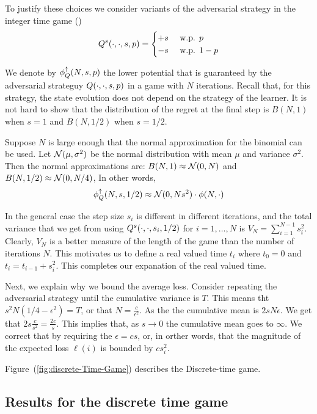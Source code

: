 \documentclass{article}[12pt]
\begin{document}
To justify these choices we consider variants of the adversarial
strategy in the integer time game (\label{eqn:adv-strat-p})
\begin{equation} \label{eqn:adv-strat-s}
  Q^s(\cdot,\cdot,s,p) =
  \begin{cases}
    +s & \mbox{ w.p. } p\\
    -s & \mbox{ w.p. } 1-p\\
  \end{cases}
\end{equation}

We denote by $\phi_{Q}^{\uparrow}(N,s,p)$ the lower potential that is guaranteed
by the adversarial strateguy $Q(\cdot,\cdot,s,p)$ in a game with
$N$ iterations. Recall that, for this strategy, the state evolution
does not depend on the strategy of the learner. It is not hard to
show that the distribution of the regret at the final step is $B(N,1)$
when $s=1$ and $B(N,1/2)$ when $s=1/2$.

Suppose $N$ is large enough that the normal approximation for the
binomial can be used. Let ${\cal N}(\mu,\sigma^2)$ be the normal
distribution with mean $\mu$ and variance $\sigma^2$. Then the normal
approximations are:
$B(N,1) \approx {\cal N}(0,N)$ and $B(N,1/2) \approx {\cal N}(0,N/4)$,
In other words,
$$\phi_{Q}^{\uparrow}(N,s,1/2) \approx {\cal N}(0,Ns^2) \cdot \phi(N,\cdot)$$

In the general case the step size $s_i$ is  different in different
iterations, and the total variance that we get from using
$Q^s(\cdot,\cdot,s_i,1/2)$ for $i=1,\ldots,N$ is
$V_N=\sum_{i=1}^{N-1}s_i^2$. Clearly, $V_N$ is a better measure of the
length of the game than the number of iterations $N$. This motivates
us to define a real valued time $t_i$ where $t_0=0$ and $t_i = t_{i-1}+s_i^2$.
This completes our expanation of the real valued time.

Next, we explain why we bound the average loss. Consider repeating the
adversarial strategy until the cumulative variance is $T$.  This means
tht $s^2 N(1/4-\epsilon^2)=T$, or that $N = \frac{c}{\epsilon^2}$.
As the the cumulative mean is $2sN \epsilon$. We get that $2s
\frac{c}{s^2} =   \frac{2c}{s}$. This implies that, as $s \to 0$ the
cumulative mean goes to $\infty$. We correct that by requiring the
$\epsilon = c s$, or, in orther words, that the magnitude of the
expected loss $\ell(i)$ is bounded by $c s_i^2$.

Figure~(\ref{fig:discrete-Time-Game}) describes the Discrete-time game.


\subsection{Results for the discrete time game}
\end{document}
